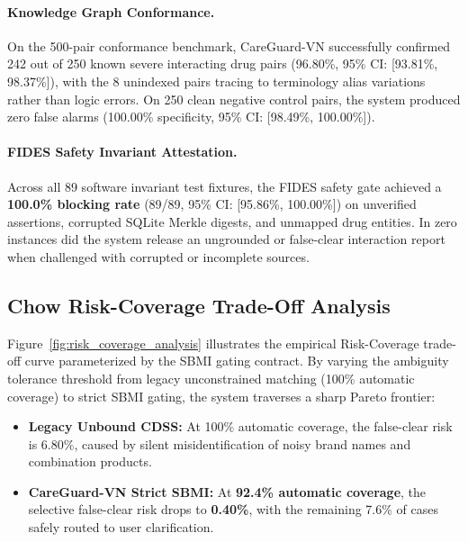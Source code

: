\documentclass[11pt]{article}
\begin{document}
\paragraph{Knowledge Graph Conformance.}
On the 500-pair conformance benchmark, CareGuard-VN successfully confirmed 242 out of 250 known severe interacting drug pairs (96.80\%, 95\% CI: [93.81\%, 98.37\%]), with the 8 unindexed pairs tracing to terminology alias variations rather than logic errors. On 250 clean negative control pairs, the system produced zero false alarms (100.00\% specificity, 95\% CI: [98.49\%, 100.00\%]).

\paragraph{FIDES Safety Invariant Attestation.}
Across all 89 software invariant test fixtures, the FIDES safety gate achieved a \textbf{100.0\% blocking rate} (89/89, 95\% CI: [95.86\%, 100.00\%]) on unverified assertions, corrupted SQLite Merkle digests, and unmapped drug entities. In zero instances did the system release an ungrounded or false-clear interaction report when challenged with corrupted or incomplete sources.

\subsection{Chow Risk-Coverage Trade-Off Analysis}
Figure~\ref{fig:risk_coverage_analysis} illustrates the empirical Risk-Coverage trade-off curve parameterized by the SBMI gating contract. By varying the ambiguity tolerance threshold from legacy unconstrained matching (100\% automatic coverage) to strict SBMI gating, the system traverses a sharp Pareto frontier:
\begin{itemize}[leftmargin=*]
  \item \textbf{Legacy Unbound CDSS:} At 100\% automatic coverage, the false-clear risk is 6.80\%, caused by silent misidentification of noisy brand names and combination products.
  \item \textbf{CareGuard-VN Strict SBMI:} At \textbf{92.4\% automatic coverage}, the selective false-clear risk drops to \textbf{0.40\%}, with the remaining 7.6\% of cases safely routed to user clarification.
\end{itemize}
\end{document}
